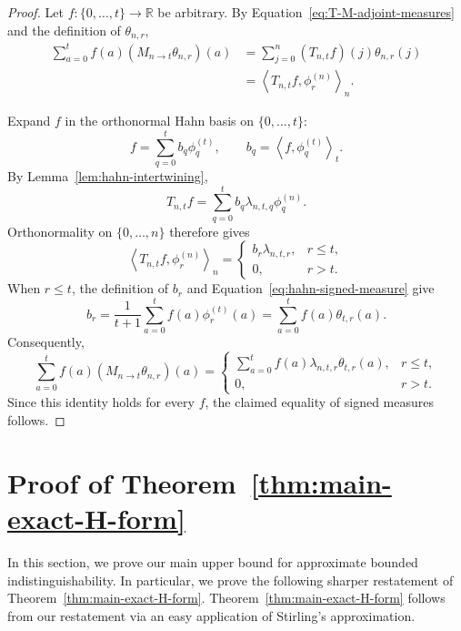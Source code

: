 \documentclass[manuscript,nonacm]{acmart}
\begin{document}
\begin{proof}
Let \(f:\{0,\dots,t\}\to\mathbb R\) be arbitrary. By
Equation~\eqref{eq:T-M-adjoint-measures} and the definition of
\(\theta_{n,r}\),
\[
\begin{aligned}
    \sum_{a=0}^t
    f(a)(M_{n\to t}\theta_{n,r})(a)
    &=
    \sum_{j=0}^n
    (T_{n,t}f)(j)\theta_{n,r}(j)\\
    &=
    \left\langle
        T_{n,t}f,\phi_r^{(n)}
    \right\rangle_n.
\end{aligned}
\]

Expand \(f\) in the orthonormal Hahn basis on
\(\{0,\dots,t\}\):
\[
    f
    =
    \sum_{q=0}^t b_q\phi_q^{(t)},
    \qquad
    b_q
    =
    \left\langle f,\phi_q^{(t)}\right\rangle_t.
\]
By Lemma~\ref{lem:hahn-intertwining},
\[
    T_{n,t}f
    =
    \sum_{q=0}^t
    b_q\lambda_{n,t,q}\phi_q^{(n)}.
\]
Orthonormality on \(\{0,\dots,n\}\) therefore gives
\[
    \left\langle
        T_{n,t}f,\phi_r^{(n)}
    \right\rangle_n
    =
    \begin{cases}
        b_r\lambda_{n,t,r},
            & r\le t,\\
        0,
            & r>t.
    \end{cases}
\]
When \(r\le t\), the definition of \(b_r\) and
Equation~\eqref{eq:hahn-signed-measure} give
\[
    b_r
    =
    \frac{1}{t+1}
    \sum_{a=0}^t f(a)\phi_r^{(t)}(a)
    =
    \sum_{a=0}^t f(a)\theta_{t,r}(a).
\]
Consequently,
\[
    \sum_{a=0}^t
    f(a)(M_{n\to t}\theta_{n,r})(a)
    =
    \begin{cases}
        \displaystyle
        \sum_{a=0}^t
        f(a)\lambda_{n,t,r}\theta_{t,r}(a),
            & r\le t,\\[3ex]
        0,
            & r>t.
    \end{cases}
\]
Since this identity holds for every \(f\), the claimed equality of
signed measures follows.
\end{proof}

\section{Proof of Theorem~\ref{thm:main-exact-H-form}}
\label{s:main}
In this section, we prove our main upper bound for approximate bounded indistinguishability. In particular, we prove the following sharper restatement of Theorem~\ref{thm:main-exact-H-form}. Theorem~\ref{thm:main-exact-H-form} follows from our restatement via an easy application of Stirling's approximation. 
\end{document}
